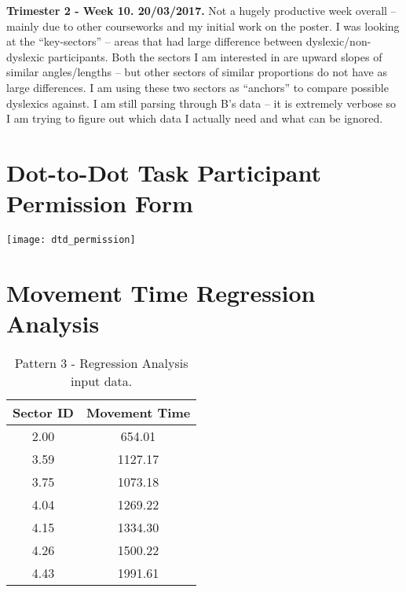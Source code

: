 \begin{appendices}
		\textbf{Trimester 2 - Week 10. 20/03/2017.}
		Not a hugely productive week overall – mainly due to other courseworks and my initial work on the poster.
		I was looking at the “key-sectors” – areas that had large difference between dyslexic/non-dyslexic participants.
		Both the sectors I am interested in are upward slopes of similar angles/lengths – but other sectors of similar proportions do not have as large differences.
		I am using these two sectors as “anchors” to compare possible dyslexics against.
		I am still parsing through B’s data – it is extremely verbose so I am trying to figure out which data I actually need and what can be ignored.
			
	\section{Dot-to-Dot Task Participant Permission Form}
		\label{app_permission}
		\texttt{[image: dtd\_permission]}
		
	\section{Movement Time Regression Analysis}
		\label{app_reg}
		\begin{table}[h]
			\centering
			\caption{Pattern 3 - Regression Analysis input data.}
			\label{tab_pat_3_reg}
			\begin{tabular}{|c|c|}
				\hline
				\textbf{Sector ID} & \textbf{Movement Time} \\ \hline
				2.00               & 654.01                 \\ \hline
				3.59               & 1127.17                \\ \hline
				3.75               & 1073.18                \\ \hline
				4.04               & 1269.22                \\ \hline
				4.15               & 1334.30                \\ \hline
				4.26               & 1500.22                \\ \hline
				4.43               & 1991.61                \\ \hline
			\end{tabular}
		\end{table}
		

\end{appendices}
